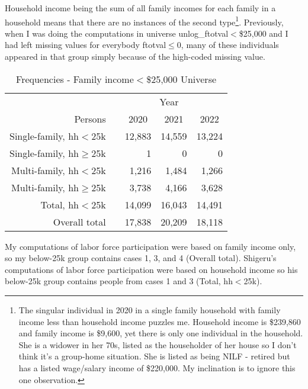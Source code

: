 \documentclass{article}
\newcommand{\mct}[1]{\multicolumn{1}{c}{#1}}
\newcommand{\mc}[3]{\multicolumn{#1}{#2}{#3}}
\begin{document}
	Household income being the sum of all family incomes for each family in a household means that there are no instances of the second type\footnote{The singular individual in 2020 in a single family household with family income less than household income puzzles me. Household income is \$239,860 and family income is \$9,600, yet there is only one individual in the household. She is a widower in her 70s, listed as the householder of her house so I don't think it's a group-home situation. She is listed as being NILF - retired but has a listed wage/salary income of \$220,000. My inclination is to ignore this one observation.}. Previously, when I was doing the computations in universe unlog\_ftotval$<$\$25,000 and I had left missing values for everybody ftotval$\le$0, many of these individuals appeared in that group simply because of the high-coded missing value.
	
	\begin{table}[H]
		\centering
		\caption{Frequencies - Family income$<$\$25,000 Universe}
		\begin{tabularx}{0.8\textwidth}{@{\extracolsep{\fill}}r r r r r }
			\toprule 
			& \mc{4}{c}{Year}  \\ \cmidrule(lr){2-5}
			Persons 	& 		&	\mct{2020}	&	\mct{2021}	&	\mct{2022}	\\ \midrule
			Single-family, hh$<$25k \hspace{0.1cm} 		&	&	12,883	&	14,559	&	13,224	\\	
			Single-family, hh$\ge$25k \hspace{0.1cm} 		&	&	1	&	0	&	0	\\	
		
			Multi-family, hh$<$25k \hspace{0.1cm}  	&	&	1,216	&	1,484	&	1,266	\\
			Multi-family, hh$\ge$25k \hspace{0.1cm}  	&	&	3,738	&	4,166	&	3,628	\\
			\midrule
			Total, hh$<$25k \hspace{0.1cm}  	&	&	14,099	&	16,043	&	14,491	\\
			Overall total \hspace{0.1cm}  	&	&	17,838	&	20,209	&	18,118	\\
			\bottomrule
		\end{tabularx}
		\vspace{1mm}
		\vspace{1mm}
	\end{table}
	
	
	My computations of labor force participation were based on family income only, so my below-25k group contains cases 1, 3, and 4 (Overall total). Shigeru's computations of labor force participation were based on household income so his below-25k group contains people from cases 1 and 3 (Total, hh$<$25k).
\end{document}

